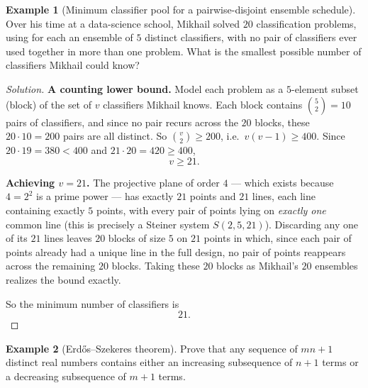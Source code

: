 \documentclass[11pt]{article}
\theoremstyle{definition}
\newtheorem{example}{Example}[section]
\begin{document}
\begin{example}[Minimum classifier pool for a pairwise-disjoint ensemble schedule]
Over his time at a data-science school, Mikhail solved $20$ classification problems, using for each an ensemble of $5$ distinct classifiers, with no pair of classifiers ever used together in more than one problem. What is the smallest possible number of classifiers Mikhail could know?
\end{example}

\begin{proof}[Solution]
\textbf{A counting lower bound.} Model each problem as a $5$-element subset (block) of the set of $v$ classifiers Mikhail knows. Each block contains $\binom52=10$ pairs of classifiers, and since no pair recurs across the $20$ blocks, these $20\cdot10=200$ pairs are all distinct. So $\binom v2\ge200$, i.e.\ $v(v-1)\ge400$. Since $20\cdot19=380<400$ and $21\cdot20=420\ge400$,
\[
v\ge21.
\]

\textbf{Achieving $v=21$.} The projective plane of order $4$ — which exists because $4=2^2$ is a prime power — has exactly $21$ points and $21$ lines, each line containing exactly $5$ points, with every pair of points lying on \emph{exactly one} common line (this is precisely a Steiner system $S(2,5,21)$). Discarding any one of its $21$ lines leaves $20$ blocks of size $5$ on $21$ points in which, since each pair of points already had a unique line in the full design, no pair of points reappears across the remaining $20$ blocks. Taking these $20$ blocks as Mikhail's $20$ ensembles realizes the bound exactly.

So the minimum number of classifiers is
\[
\boxed{21}.
\]
\end{proof}

\begin{example}[Erdős–Szekeres theorem]
Prove that any sequence of $mn+1$ distinct real numbers contains either an increasing subsequence of $n+1$ terms or a decreasing subsequence of $m+1$ terms.
\end{example}
\end{document}
